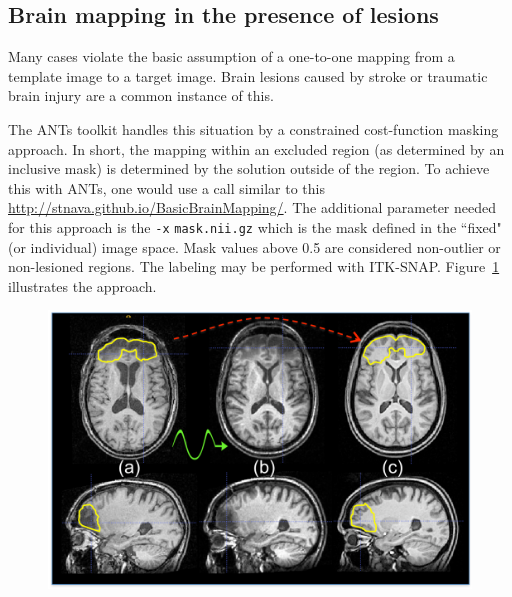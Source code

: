 \documentclass{InsightArticle}
\begin{document}
\subsection{Brain mapping in the presence of lesions}
Many cases violate the basic assumption of a one-to-one mapping from a
template image to a target image. Brain lesions caused by stroke or
traumatic brain injury are a common instance of this.

The ANTs toolkit handles this situation by a constrained cost-function
masking approach. In short, the mapping within an excluded region (as
determined by an inclusive mask) is determined by the solution outside
of the region. To achieve this with ANTs, one would use a call similar
to this \href{http://stnava.github.io/BasicBrainMapping/}{http://stnava.github.io/BasicBrainMapping/}.
The additional parameter needed for this approach 
is the \texttt{-x}  \texttt{mask.nii.gz}  which 
is the mask defined in the ``fixed" (or individual) image space.  
Mask values above 0.5 are considered non-outlier or non-lesioned regions.
The labeling may be performed with ITK-SNAP. 
Figure~\ref{fig:lesion} illustrates the approach.
\begin{figure}
\includegraphics[width=1\textwidth]{Figures/lesionstudy.pdf}
\label{fig:lesion}
\end{figure}
\end{document}
